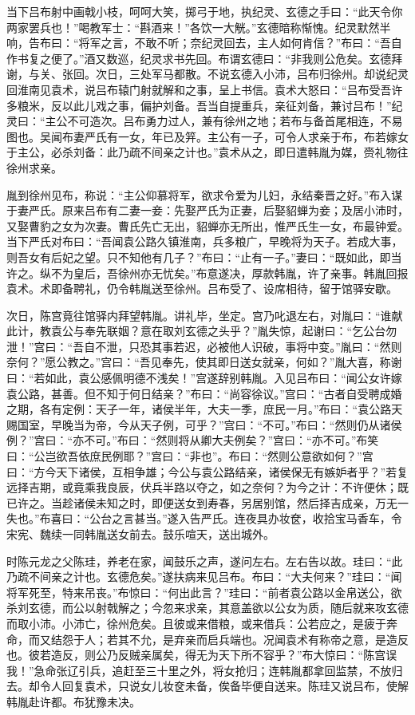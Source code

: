 当下吕布射中画戟小枝，呵呵大笑，掷弓于地，执纪灵、玄德之手曰：“此天令你两家罢兵也！”喝教军士：“斟酒来！”各饮一大觥。”玄德暗称惭愧。纪灵默然半响，告布曰：“将军之言，不敢不听；奈纪灵回去，主人如何肯信？”布曰：“吾自作书复之便了。”酒又数巡，纪灵求书先回。布谓玄德曰：“非我则公危矣。玄德拜谢，与关、张回。次日，三处军马都散。不说玄德入小沛，吕布归徐州。却说纪灵回淮南见袁术，说吕布辕门射就解和之事，呈上书信。袁术大怒曰：“吕布受吾许多粮米，反以此儿戏之事，偏护刘备。吾当自提重兵，亲征刘备，兼讨吕布！”纪灵曰：“主公不可造次。吕布勇力过人，兼有徐州之地；若布与备首尾相连，不易图也。吴闻布妻严氏有一女，年已及笄。主公有一子，可令人求亲于布，布若嫁女于主公，必杀刘备：此乃疏不间亲之计也。”袁术从之，即日遣韩胤为媒，赍礼物往徐州求亲。

胤到徐州见布，称说：“主公仰慕将军，欲求令爱为儿妇，永结秦晋之好。”布入谋于妻严氏。原来吕布有二妻一妾：先娶严氏为正妻，后娶貂蝉为妾；及居小沛时，又娶曹豹之女为次妻。曹氏先亡无出，貂蝉亦无所出，惟严氏生一女，布最钟爱。当下严氏对布曰：“吾闻袁公路久镇淮南，兵多粮广，早晚将为天子。若成大事，则吾女有后妃之望。只不知他有几子？”布曰：“止有一子。”妻曰：“既如此，即当许之。纵不为皇后，吾徐州亦无忧矣。”布意遂决，厚款韩胤，许了亲事。韩胤回报袁术。术即备聘礼，仍令韩胤送至徐州。吕布受了、设席相待，留于馆驿安歇。

次日，陈宫竟往馆驿内拜望韩胤。讲礼毕，坐定。宫乃叱退左右，对胤曰：“谁献此计，教袁公与奉先联姻？意在取刘玄德之头乎？”胤失惊，起谢曰：“乞公台勿泄！”宫曰：“吾自不泄，只恐其事若迟，必被他人识破，事将中变。”胤曰：“然则奈何？”愿公教之。”宫曰：“吾见奉先，使其即日送女就亲，何如？”胤大喜，称谢曰：“若如此，袁公感佩明德不浅矣！”宫遂辞别韩胤。入见吕布曰：“闻公女许嫁袁公路，甚善。但不知于何日结亲？”布曰：“尚容徐议。”宫曰：“古者自受聘成婚之期，各有定例：天子一年，诸侯半年，大夫一季，庶民一月。”布曰：“袁公路天赐国室，早晚当为帝，今从天子例，可乎？”宫曰：“不可。”布曰：“然则仍从诸侯例？”宫曰：“亦不可。”布曰：“然则将从卿大夫例矣？”宫曰：“亦不可。”布笑曰：“公岂欲吾依庶民例耶？”宫曰：“非也”。布曰：“然则公意欲如何？”宫曰：“方今天下诸侯，互相争雄；今公与袁公路结亲，诸侯保无有嫉妒者乎？”若复远择吉期，或竟乘我良辰，伏兵半路以夺之，如之奈何？为今之计：不许便休；既已许之。当趁诸侯未知之时，即便送女到寿春，另居别馆，然后择吉成亲，万无一失也。”布喜曰：“公台之言甚当。”遂入告严氏。连夜具办妆奁，收拾宝马香车，令宋宪、魏续一同韩胤送女前去。鼓乐喧天，送出城外。

时陈元龙之父陈珪，养老在家，闻鼓乐之声，遂问左右。左右告以故。珪曰：“此乃疏不间亲之计也。玄德危矣。”遂扶病来见吕布。布曰：“大夫何来？”珪曰：“闻将军死至，特来吊丧。”布惊曰：“何出此言？”珪曰：“前者袁公路以金帛送公，欲杀刘玄德，而公以射戟解之；今忽来求亲，其意盖欲以公女为质，随后就来攻玄德而取小沛。小沛亡，徐州危矣。且彼或来借粮，或来借兵：公若应之，是疲于奔命，而又结怨于人；若其不允，是弃亲而启兵端也。况闻袁术有称帝之意，是造反也。彼若造反，则公乃反贼亲属矣，得无为天下所不容乎？”布大惊曰：“陈宫误我！”急命张辽引兵，追赶至三十里之外，将女抢归；连韩胤都拿回监禁，不放归去。却令人回复袁术，只说女儿妆奁未备，俟备毕便自送来。陈珪又说吕布，使解韩胤赴许都。布犹豫未决。

